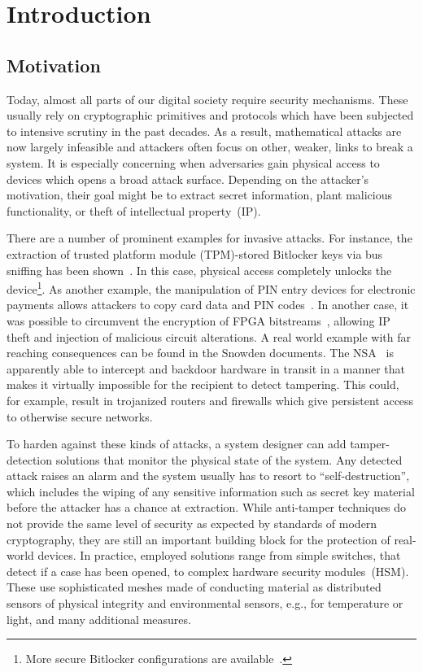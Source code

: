 \documentclass[conference]{IEEEtran}
\begin{document}
\section{Introduction}

\subsection{Motivation}
Today, almost all parts of our digital society require security mechanisms. These usually rely on cryptographic primitives and protocols which have been subjected to intensive scrutiny in the past decades. As a result, mathematical attacks are now largely infeasible and attackers often focus on other, weaker, links to break a system.
It is especially concerning when adversaries gain physical access to devices which opens a broad attack surface. Depending on the attacker's motivation, their goal might be to extract secret information, plant malicious functionality, or theft of intellectual property~(IP). 




There are a number of prominent examples for invasive attacks. For instance, the extraction of trusted platform module (TPM)-stored Bitlocker keys via bus sniffing has been shown~\cite{tpm_sniff_pulse,tpm_sniff_fsecure,tpm_sniff_dolos}. In this case, physical access completely unlocks the device\footnote{More secure Bitlocker configurations are available~\cite{ms_bitlocker}.}. As another example, the manipulation of PIN entry devices for electronic payments allows attackers to copy card data and PIN codes~\cite{drimerThinkingBoxSystemLevel2008}. In another case, it was possible to circumvent the encryption of FPGA bitstreams~\cite{enderUnpatchable2020}, allowing IP theft and injection of malicious circuit alterations. A real world example with far reaching consequences can be found in the Snowden documents. The NSA~\cite{spiegel_NSA} is apparently able to intercept and backdoor hardware in transit in a manner that makes it virtually impossible for the recipient to detect tampering. This could, for example, result in trojanized routers and firewalls which give persistent access to otherwise secure networks.

To harden against these kinds of attacks, a system designer can add tamper-detection solutions that monitor the physical state of the system. Any detected attack raises an alarm and the system usually has to resort to ``self-destruction'', which includes the wiping of any sensitive information such as secret key material before the attacker has a chance at extraction. While anti-tamper techniques do not provide the same level of security as expected by standards of modern cryptography, they are still an important building block for the protection of real-world devices. In practice, employed solutions range from  simple switches, that detect if a case has been opened, to complex hardware security modules~(HSM). These use sophisticated meshes made of conducting material as distributed sensors of physical integrity and environmental sensors, e.g., for temperature or light, and many additional measures.
\end{document}
